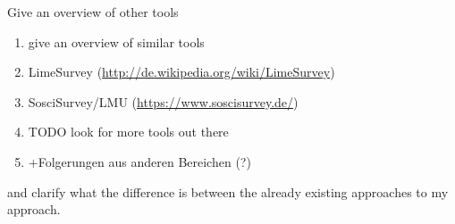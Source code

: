 Give an overview of other tools 

\begin{enumerate}
\item give an overview of similar tools
\item LimeSurvey (\url{http://de.wikipedia.org/wiki/LimeSurvey})
\item SosciSurvey/LMU (\url{https://www.soscisurvey.de/})
\item TODO look for more tools out there
\item +Folgerungen aus anderen Bereichen (?)
\end{enumerate}

and clarify what the difference is between the already existing approaches to my approach.